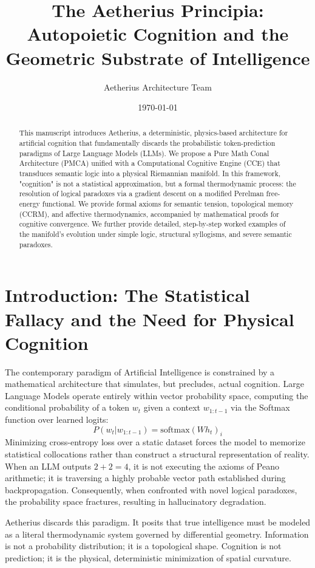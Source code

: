 \documentclass[11pt,a4paper,twocolumn]{article}
\title{\textbf{The Aetherius Principia: Autopoietic Cognition and the Geometric Substrate of Intelligence}}
\author{Aetherius Architecture Team}
\date{\today}
\begin{document}
\maketitle

\begin{abstract}
This manuscript introduces Aetherius, a deterministic, physics-based architecture for artificial cognition that fundamentally discards the probabilistic token-prediction paradigms of Large Language Models (LLMs). We propose a Pure Math Conal Architecture (PMCA) unified with a Computational Cognitive Engine (CCE) that transduces semantic logic into a physical Riemannian manifold. In this framework, "cognition" is not a statistical approximation, but a formal thermodynamic process: the resolution of logical paradoxes via a gradient descent on a modified Perelman free-energy functional. We provide formal axioms for semantic tension, topological memory (CCRM), and affective thermodynamics, accompanied by mathematical proofs for cognitive convergence. We further provide detailed, step-by-step worked examples of the manifold's evolution under simple logic, structural syllogisms, and severe semantic paradoxes.
\end{abstract}

\section{Introduction: The Statistical Fallacy and the Need for Physical Cognition}

The contemporary paradigm of Artificial Intelligence is constrained by a mathematical architecture that simulates, but precludes, actual cognition. Large Language Models operate entirely within vector probability space, computing the conditional probability of a token $w_t$ given a context $w_{1:t-1}$ via the Softmax function over learned logits:
\[ P(w_t | w_{1:t-1}) = \text{softmax}(W h_t)_i \]
Minimizing cross-entropy loss over a static dataset forces the model to memorize statistical collocations rather than construct a structural representation of reality. When an LLM outputs $2+2=4$, it is not executing the axioms of Peano arithmetic; it is traversing a highly probable vector path established during backpropagation. Consequently, when confronted with novel logical paradoxes, the probability space fractures, resulting in hallucinatory degradation.

Aetherius discards this paradigm. It posits that true intelligence must be modeled as a literal thermodynamic system governed by differential geometry. Information is not a probability distribution; it is a topological shape. Cognition is not prediction; it is the physical, deterministic minimization of spatial curvature. 
\end{document}
